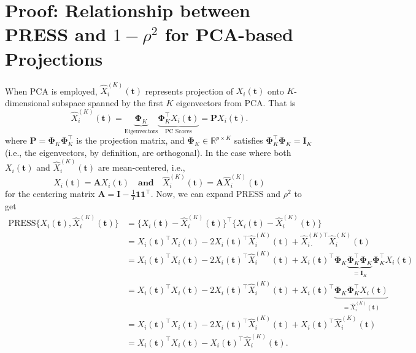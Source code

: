 \section*{Proof: Relationship between PRESS and $1 -\rho^2$ for PCA-based Projections}

When PCA is employed, $\widehat{X}^{(K)}_{i}(\mathbf{t})$ represents projection of $X_{i}(\mathbf{t})$ onto \( K \)-dimensional subspace spanned by the first $K$ eigenvectors from PCA. That is
$$
 \widehat{X}^{(K)}_{i} (\mathbf{t}) = \underbrace{\boldsymbol{\Phi}_K}_{\text{Eigenvectors}} \underbrace{\boldsymbol{\Phi}_K^\top X_i(\mathbf{t})}_{\text{PC Scores}}
 = \mathbf{P} X_i(\mathbf{t}).
$$
where \( \mathbf{P} = \bm{\Phi}_K \bm{\Phi}_K^\top \) is the projection matrix, and \( \bm{\Phi}_K \in \mathbb{R}^{p \times K} \) satisfies \( \bm{\Phi}_K^\top \bm{\Phi}_K = \mathbf{I}_K \) (i.e., the eigenvectors, by definition, are orthogonal).
In the case where both $X_i(\mathbf{t})$ and $\widehat{X}^{(K)}_{i}(\mathbf{t})$ are mean-centered, i.e.,
$$
    X_i(\mathbf{t}) = \mathbf{A} X_i(\mathbf{t})
 \quad \textbf{and} \quad 
 \widehat{X}^{(K)}_{i}(\mathbf{t}) = \mathbf{A}\widehat{X}^{(K)}_{i}(\mathbf{t})
$$
for the centering matrix \( \mathbf{A} = \mathbf{I} - \frac{1}{T} \mathbf{1} \mathbf{1}^\top \).
Now, we can expand PRESS and $\rho^2$ to get
\begin{align*}
    \text{PRESS}\bigg\{X_{i}(\mathbf{t}),  \widehat{X}^{(K)}_{i} (\mathbf{t})\bigg\} &= \bigg\{X_{i}(\mathbf{t}) -  \widehat{X}^{(K)}_{i} (\mathbf{t})\bigg\}^\top \bigg\{X_{i}(\mathbf{t}) -  \widehat{X}^{(K)}_{i} (\mathbf{t})\bigg\} \\
    &= 
    X_{i}(\mathbf{t})^\top X_{i}(\mathbf{t}) - 2 X_{i}(\mathbf{t})^\top  \widehat{X}^{(K)}_{i} (\mathbf{t}) + \widehat{X}^{(K)\top}_{i\cdot}  \widehat{X}^{(K)}_{i} (\mathbf{t}) \\
    &= X_{i}(\mathbf{t})^\top X_{i}(\mathbf{t}) - 2 X_{i}(\mathbf{t})^\top  \widehat{X}^{(K)}_{i} (\mathbf{t}) + X_{i}(\mathbf{t})^\top \boldsymbol{\Phi}_K \underbrace{\boldsymbol{\Phi}_K^\top \boldsymbol{\Phi}_K}_{= \mathbf{I}_K} \boldsymbol{\Phi}_K^\top X_{i}(\mathbf{t}) \\
    &=  X_{i}(\mathbf{t})^\top X_{i}(\mathbf{t}) - 2 X_{i}(\mathbf{t})^\top  \widehat{X}^{(K)}_{i} (\mathbf{t}) + X_{i}(\mathbf{t})^\top \underbrace{\boldsymbol{\Phi}_K \boldsymbol{\Phi}_K^\top X_{i}(\mathbf{t})}_{= \widehat{X}^{(K)}_{i} (\mathbf{t})} \\
    &= X_{i}(\mathbf{t})^\top X_{i}(\mathbf{t}) - 2 X_{i}(\mathbf{t})^\top  \widehat{X}^{(K)}_{i} (\mathbf{t}) + X_{i}(\mathbf{t})^\top  \widehat{X}^{(K)}_{i} (\mathbf{t}) \\
    &= X_{i}(\mathbf{t})^\top X_{i}(\mathbf{t}) - X_{i}(\mathbf{t})^\top  \widehat{X}^{(K)}_{i} (\mathbf{t}).
\end{align*}
